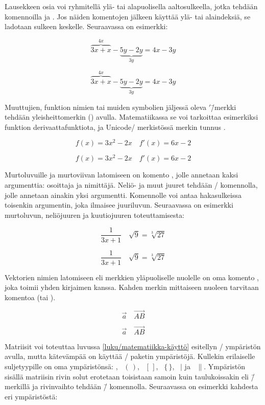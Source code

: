 \noindent
Lausekkeen osia voi ryhmitellä ylä- tai alapuolisella aaltosulkeella,
jotka tehdään komennoilla  ja .
Jos näiden komentojen jälkeen käyttää ylä- tai alaindeksiä, se ladotaan
sulkeen keskelle. Seuraavassa on esimerkki:

\begin{koodilohkosis}
\[ \overbrace{3x + x}^{4x} - \underbrace{5y - 2y}_{3y} = 4x - 3y \]
\end{koodilohkosis}
\[ \overbrace{3x + x}^{4x} - \underbrace{5y - 2y}_{3y} = 4x - 3y \]

\noindent
Muuttujien, funktion nimien tai muiden symbolien jäljessä oleva
$'$\=/merkki tehdään yleisheittomerkin () avulla.
Matematiikassa se voi tarkoittaa esimerkiksi funktion
derivaattafunktiota, ja Unicode\-/ merkistössä merkin tunnus
.

\begin{koodilohkosis}
\[ f(x) = 3x^2 - 2x \quad f'(x) = 6x - 2 \]
\end{koodilohkosis}
\[ f(x) = 3x^2 - 2x \quad f'(x) = 6x - 2 \]

\noindent
Murtoluvuille ja murtoviivan latomiseen on komento ,
jolle annetaan kaksi argumenttia: osoittaja ja nimittäjä. Neliö- ja muut
juuret tehdään \-/ komennolla, jolle annetaan ainakin
yksi argumentti. Komennolle voi antaa hakasulkeissa toisenkin
argumentin, joka ilmaisee juuriluvun. Seuraavassa on esimerkki
murtoluvun, neliöjuuren ja kuutiojuuren toteuttamisesta:

\begin{koodilohkosis}
\[ \frac{1}{3x + 1} \quad \sqrt{9} = \sqrt[3]{27} \]
\end{koodilohkosis}
\[ \frac{1}{3x + 1} \quad \sqrt{9} = \sqrt[3]{27} \]

\noindent
Vektorien nimien latomiseen eli merkkien yläpuoliselle nuolelle on oma
komento , joka toimii yhden kirjaimen kanssa. Kahden
merkin mittaiseen nuoleen tarvitaan komentoa 
(tai ).

\begin{koodilohkosis}
\[ \vec{a} \quad \overrightarrow{AB} \]
\end{koodilohkosis}
\[ \vec{a} \quad \overrightarrow{AB} \]

\noindent
Matriisit voi toteuttaa luvussa \ref{luku/matematiikka-käyttö} esitellyn
\-/ ympäristön avulla, mutta kätevämpää on käyttää
\-/ paketin ympäristöjä. Kullekin erilaiselle
suljetyypille on oma ympäristönsä: ,
~$(\,)$, ~$[\,]$,
~$\{\,\}$, ~$|$ ja
~$\|$. Ympäristön sisällä matriisin rivin solut
erotetaan toisistaan samoin kuin taulukoissakin eli \koodi{\&}\=/
merkillä ja rivinvaihto tehdään \mkomento{\keno}\=/ komennolla.
Seuraavassa on esimerkki kahdesta eri ympäristöstä:

